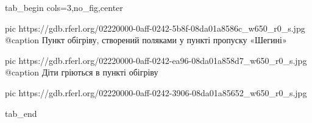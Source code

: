  
 
 
 
 


\ifcmt
  tab_begin cols=3,no_fig,center

     pic https://gdb.rferl.org/02220000-0aff-0242-5b8f-08da01a8586c_w650_r0_s.jpg
		 @caption Пункт обігріву, створений поляками у пункті пропуску «Шегині»

		 pic https://gdb.rferl.org/02220000-0aff-0242-ea96-08da01a858d7_w650_r0_s.jpg
		 @caption Діти гріються в пункті обігріву

		 pic https://gdb.rferl.org/02220000-0aff-0242-3906-08da01a85652_w650_r0_s.jpg


  tab_end
\fi
